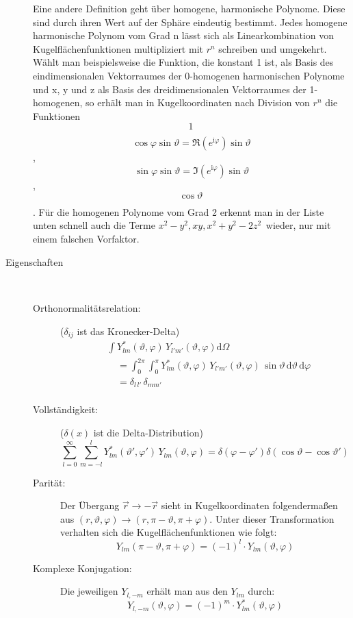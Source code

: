 \begin{definition}
\begin{description}
Eine andere Definition geht über homogene, harmonische Polynome. Diese sind durch ihren Wert auf der Sphäre eindeutig bestimmt. Jedes homogene harmonische Polynom vom Grad n lässt sich als Linearkombination von Kugelflächenfunktionen multipliziert mit $ r^n$ schreiben und umgekehrt. Wählt man beispielsweise die Funktion, die konstant 1 ist, als Basis des eindimensionalen Vektorraumes der 0-homogenen harmonischen Polynome und x, y und z als Basis des dreidimensionalen Vektorraumes der 1-homogenen, so erhält man in Kugelkoordinaten nach Division von $ r^n $  die Funktionen
\[1 \frac{}{}\]
\[ \cos{\varphi} \sin \vartheta = \Re{(e^{\mathrm i\varphi})} \sin \vartheta \],
\[\sin \varphi \sin \vartheta = \Im{(e^{\mathrm i\varphi})} \sin \vartheta \],
\[\cos \vartheta \frac{}{}\].
Für die homogenen Polynome vom Grad 2 erkennt man in der Liste unten schnell auch die Terme $ x^2-y^2, xy, x^2+y^2-2 z^2\frac{}{} $ wieder, nur mit einem falschen Vorfaktor.

	\item[Eigenschaften]\hspace{1cm} \\
	\begin{description}
		\item[Orthonormalitätsrelation:] ($\delta_{ij}$ ist das Kronecker-Delta)
\begin{align*}
	&\int Y_{lm}^{*}(\vartheta,\varphi) \, Y_{l'm'}(\vartheta,\varphi) \mathrm d\Omega \\
	&\quad = \int_{0}^{2\pi} \int_{0}^{\pi} Y_{lm}^{*}(\vartheta,\varphi) \, Y_{l'm'}(\vartheta,\varphi)
	\, \sin{\vartheta} \, \mathrm d\vartheta \,\mathrm d\varphi \\
	&\quad = \delta_{l\,l'} \, \delta_{mm'}\\
\end{align*}
	\item[Vollständigkeit:] ($\delta(x)$ ist die Delta-Distribution)
\[\sum_{l=0}^{\infty}\sum_{m=-l}^{l}Y_{lm}^{*}(\vartheta ',\varphi ') \, Y_{lm}(\vartheta,\varphi) = \delta(\varphi-\varphi ')\delta(\cos{\vartheta} -\cos{\vartheta '})\]
	\item[Parität:] Der Übergang $\vec r \rightarrow -\vec r$ sieht in Kugelkoordinaten folgendermaßen aus $(r,\vartheta,\varphi) \rightarrow (r,\pi-\vartheta,\pi+\varphi)$. Unter dieser Transformation verhalten sich die Kugelflächenfunktionen wie folgt:
\[Y_{lm}(\pi-\vartheta,\pi+\varphi)=(-1)^l\cdot Y_{lm}(\vartheta,\varphi)\]
	\item[Komplexe Konjugation:] Die jeweiligen $Y_{l,-m}$ erhält man aus den $Y_{lm}$ durch:
\[Y_{l,-m}(\vartheta,\varphi)=(-1)^m\cdot Y_{lm}^*(\vartheta,\varphi)\]
\end{description}
\end{description}
\end{definition}


